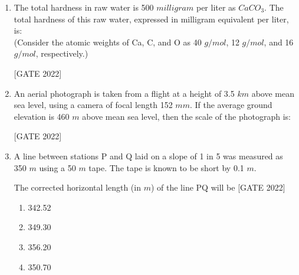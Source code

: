\documentclass[journal,12pt,onecolumn]{IEEEtran}
\theoremstyle{remark}
\begin{document}
\begin{enumerate}
\item The total hardness in raw water is 500 $milligram$ per liter as $CaCO_3$. The total hardness of this raw water, expressed in milligram equivalent per liter, is:\\
(Consider the atomic weights of Ca, C, and O as 40 $g/mol$, 12 $g/mol$, and 16 $g/mol$, respectively.)

\hfill{[GATE 2022]}\begin{enumerate}
\end{enumerate}

\vspace{1em}

\item An aerial photograph is taken from a flight at a height of 3.5 $km$ above mean sea level, using a camera of focal length 152 $mm$. If the average ground elevation is 460 $m$ above mean sea level, then the scale of the photograph is:

\hfill{[GATE 2022]}\begin{enumerate}
\end{enumerate}

\item A line between stations P and Q laid on a slope of 1 in 5 was measured as 350 $m$ using a 50 $m$ tape. The tape is known to be short by 0.1 $m$.

The corrected horizontal length (in $m$) of the line PQ will be
\hfill{[GATE 2022]}
\begin{multicols}{4}
\begin{enumerate}
    \item 342.52
    \item 349.30
    \item 356.20
    \item 350.70
\end{enumerate}
\end{multicols}


\end{enumerate}
\end{document}
